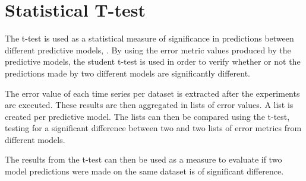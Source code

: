 
\section{Statistical T-test}
\label{section:Method:Statistical-t-test}

The t-test is used as a statistical measure of significance in predictions between different predictive models, .
By using the error metric values produced by the predictive models,
the student t-test is used in order to verify
whether or not the predictions made by two different models are significantly different.

The error value of each time series per dataset is extracted after the experiments are executed.
These results are then aggregated in lists of error values.
A list is created per predictive model.
The lists can then be compared using the t-test,
testing for a significant difference between two and two lists of error metrics from different models.

The results from the t-test can then be used as a measure to evaluate if two model predictions were made on the same dataset
is of significant difference.

